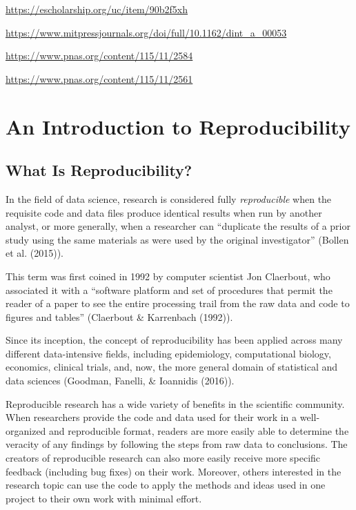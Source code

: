 \documentclass[12pt,twoside]{reedthesis}
\begin{document}
\url{https://escholarship.org/uc/item/90b2f5xh}

\url{https://www.mitpressjournals.org/doi/full/10.1162/dint_a_00053}

\url{https://www.pnas.org/content/115/11/2584}

\url{https://www.pnas.org/content/115/11/2561}

\chapter{An Introduction to Reproducibility}\label{reproducibility}

\section{What Is Reproducibility?}\label{what-is-reproducibility}

In the field of data science, research is considered fully
\emph{reproducible} when the requisite code and data files produce
identical results when run by another analyst, or more generally, when a
researcher can ``duplicate the results of a prior study using the same
materials as were used by the original investigator'' (Bollen et al.
(2015)).

This term was first coined in 1992 by computer scientist Jon Claerbout,
who associated it with a ``software platform and set of procedures that
permit the reader of a paper to see the entire processing trail from the
raw data and code to figures and tables'' (Claerbout \& Karrenbach
(1992)).

Since its inception, the concept of reproducibility has been applied
across many different data-intensive fields, including epidemiology,
computational biology, economics, clinical trials, and, now, the more
general domain of statistical and data sciences (Goodman, Fanelli, \&
Ioannidis (2016)).

Reproducible research has a wide variety of benefits in the scientific
community. When researchers provide the code and data used for their
work in a well-organized and reproducible format, readers are more
easily able to determine the veracity of any findings by following the
steps from raw data to conclusions. The creators of reproducible
research can also more easily receive more specific feedback (including
bug fixes) on their work. Moreover, others interested in the research
topic can use the code to apply the methods and ideas used in one
project to their own work with minimal effort.
\end{document}
